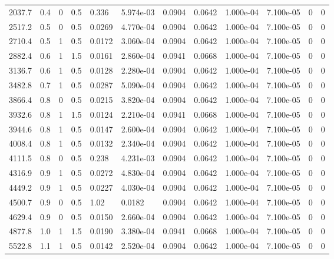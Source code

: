 \documentclass[preview]{standalone}
\begin{document}
{{\begin{tabular}{L{1.2cm}C{1.2cm} C{0.3cm}C{0.5cm} C{1.4cm}C{1.4cm} C{1.4cm}C{1.4cm} C{1.6cm}C{1.6cm} C{1.6cm}C{1.6cm}}
  2037.7  &   0.4  & 0     & 0.5 &  0.336  & 5.974e-03  &  0.0904&   0.0642& 1.000e-04 & 7.100e-05   &  0 & 0  \\ 
  2517.2  &   0.5  & 0     & 0.5 &  0.0269  & 4.770e-04  &  0.0904&   0.0642& 1.000e-04 & 7.100e-05   &  0 & 0  \\ 
  2710.4  &   0.5  & 1     & 0.5 &  0.0172  & 3.060e-04  &  0.0904&   0.0642& 1.000e-04 & 7.100e-05   &  0 & 0  \\ 
  2882.4  &   0.6  & 1     & 1.5 &  0.0161  & 2.860e-04  &  0.0941&   0.0668& 1.000e-04 & 7.100e-05   &  0 & 0  \\ 
  3136.7  &   0.6  & 1     & 0.5 &  0.0128  & 2.280e-04  &  0.0904&   0.0642& 1.000e-04 & 7.100e-05   &  0 & 0  \\ 
  3482.8  &   0.7  & 1     & 0.5 &  0.0287  & 5.090e-04  &  0.0904&   0.0642& 1.000e-04 & 7.100e-05   &  0 & 0  \\ 
  3866.4  &   0.8  & 0     & 0.5 &  0.0215  & 3.820e-04  &  0.0904&   0.0642& 1.000e-04 & 7.100e-05   &  0 & 0  \\ 
  3932.6  &   0.8  & 1     & 1.5 &  0.0124  & 2.210e-04  &  0.0941&   0.0668& 1.000e-04 & 7.100e-05   &  0 & 0  \\ 
  3944.6  &   0.8  & 1     & 0.5 &  0.0147  & 2.600e-04  &  0.0904&   0.0642& 1.000e-04 & 7.100e-05   &  0 & 0  \\ 
  4008.4  &   0.8  & 1     & 0.5 &  0.0132  & 2.340e-04  &  0.0904&   0.0642& 1.000e-04 & 7.100e-05   &  0 & 0  \\ 
  4111.5  &   0.8  & 0     & 0.5 &  0.238  & 4.231e-03  &  0.0904&   0.0642& 1.000e-04 & 7.100e-05   &  0 & 0  \\ 
  4316.9  &   0.9  & 1     & 0.5 &  0.0272  & 4.830e-04  &  0.0904&   0.0642& 1.000e-04 & 7.100e-05   &  0 & 0  \\ 
  4449.2  &   0.9  & 1     & 0.5 &  0.0227  & 4.030e-04  &  0.0904&   0.0642& 1.000e-04 & 7.100e-05   &  0 & 0  \\ 
  4500.7  &   0.9  & 0     & 0.5 &  1.02  & 0.0182  &  0.0904&   0.0642& 1.000e-04 & 7.100e-05   &  0 & 0  \\ 
  4629.4  &   0.9  & 0     & 0.5 &  0.0150  & 2.660e-04  &  0.0904&   0.0642& 1.000e-04 & 7.100e-05   &  0 & 0  \\ 
  4877.8  &   1.0  & 1     & 1.5 &  0.0190  & 3.380e-04  &  0.0941&   0.0668& 1.000e-04 & 7.100e-05   &  0 & 0  \\ 
  5522.8  &   1.1  & 1     & 0.5 &  0.0142  & 2.520e-04  &  0.0904&   0.0642& 1.000e-04 & 7.100e-05   &  0 & 0  \\ 

\end{tabular}}}
\end{document}
